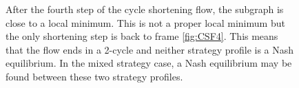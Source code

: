 \documentclass{article}
\begin{document}
\begin{figure}

    \caption[Cycle shortening flow frame 5]{After the fourth step of the cycle shortening flow, the subgraph is close to a local minimum. This is not a proper local minimum but the only shortening step is back to frame \ref{fig:CSF4}. This means that the flow ends in a 2-cycle and neither strategy profile is a Nash equilibrium. In the mixed strategy case, a Nash equilibrium may be found between these two strategy profiles.  }
    \label{fig:CSF5}
\end{figure}
\end{document}
